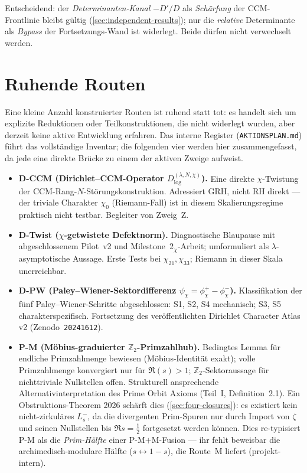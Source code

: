 \documentclass[12pt,a4paper]{article}
\theoremstyle{definition}
\theoremstyle{remark}
\begin{document}
\noindent
Entscheidend: der \emph{Determinanten-Kanal} $-D'/D$ als \emph{Schärfung} der
CCM-Frontlinie bleibt gültig (\cref{sec:independent-results}); nur die
\emph{relative} Determinante als \emph{Bypass} der Fortsetzungs-Wand ist widerlegt.
Beide dürfen nicht verwechselt werden.


\section{Ruhende Routen}
\label{sec:dormant}

Eine kleine Anzahl konstruierter Routen ist ruhend statt tot: es handelt
sich um explizite Reduktionen oder Teilkonstruktionen, die nicht widerlegt
wurden, aber derzeit keine aktive Entwicklung erfahren. Das interne Register
(\texttt{AKTIONSPLAN.md}) führt das vollständige Inventar; die folgenden
vier werden hier zusammengefasst, da jede eine direkte Brücke zu einem
der aktiven Zweige aufweist.

\begin{itemize}
  \item \textbf{D-CCM (Dirichlet--CCM-Operator
    $D^{(\lambda,N,\chi)}_{\log}$).} Eine direkte $\chi$-Twistung der
    CCM-Rang-$N$-Störungskonstruktion. Adressiert GRH, nicht RH
    direkt --- der triviale Charakter $\chi_0$ (Riemann-Fall) ist in
    diesem Skalierungsregime praktisch nicht testbar. Begleiter von
    Zweig~Z.

  \item \textbf{D-Twist ($\chi$-getwistete Defektnorm).} Diagnostische
    Blaupause mit abgeschlossenem Pilot~v2 und Milestone~2$_\chi$-Arbeit;
    umformuliert als $\lambda$-asymptotische Aussage. Erste Tests bei
    $\chi_{21}, \chi_{33}$; Riemann in dieser Skala unerreichbar.

  \item \textbf{D-PW (Paley--Wiener-Sektordifferenz
    $\psi_\chi = \phi_\chi^+ - \phi_\chi^-$).} Klassifikation der
    fünf Paley--Wiener-Schritte abgeschlossen: S1, S2, S4 mechanisch;
    S3, S5 charakterspezifisch. Fortsetzung des veröffentlichten
    Dirichlet Character Atlas v2 (Zenodo~\texttt{20241612}).

  \item \textbf{P-M (Möbius-graduierter $\mathbb{Z}_2$-Primzahlhub).}
    Bedingtes Lemma für endliche Primzahlmenge bewiesen (Möbius-Identität
    exakt); volle Primzahlmenge konvergiert nur für $\Re(s)>1$;
    $\mathbb{Z}_2$-Sektoraussage für nichttriviale Nullstellen offen.
    Strukturell ansprechende Alternativinterpretation des Prime Orbit
    Axioms (Teil~I, Definition~2.1). Ein Obstruktions-Theorem 2026 schärft
    dies (\cref{sec:four-closures}): es existiert kein nicht-zirkuläres $L_s^-$,
    da die divergenten Prim-Spuren nur durch Import von $\zeta$ und seinen
    Nullstellen bis $\Re s=\tfrac12$ fortgesetzt werden können. Dies re-typisiert
    P-M als die \emph{Prim-Hälfte} einer P-M$+$M-Fusion --- ihr fehlt beweisbar die
    archimedisch-modulare Hälfte ($s\leftrightarrow 1-s$), die Route~M liefert
    (projekt-intern).
\end{itemize}
\end{document}
